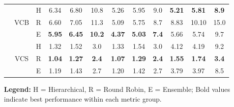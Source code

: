 \begin{table}[!h]
{\begin{tabular}{c|c|c|ccc|ccc|ccc}
& \multirow{3}{*}{VCB}
& H & 6.34 & 6.80 & 10.8 & 5.26 & 5.95 & 9.0 & \textbf{5.21} & \textbf{5.81} & \textbf{8.9} \\
& & R & 6.60 & 7.05 & 11.3 & 5.09 & 5.75 & 8.7 & 8.83 & 10.10 & 15.0 \\
& & E & \textbf{5.95} & \textbf{6.45} & \textbf{10.2} & \textbf{4.37} & \textbf{5.03} & \textbf{7.4} & 5.66 & 5.74 & 9.7 \\

& \multirow{3}{*}{VCS}
& H & 1.32 & 1.52 & 3.0 & 1.33 & 1.54 & 3.0 & 4.12 & 4.19 & 9.2 \\
& & R & \textbf{1.04} & \textbf{1.27} & \textbf{2.4} & \textbf{1.07} & \textbf{1.29} & \textbf{2.4} & \textbf{1.55} & \textbf{1.74} & \textbf{3.4} \\
& & E & 1.19 & 1.43 & 2.7 & 1.20 & 1.42 & 2.7 & 3.79 & 3.97 & 8.5 \\

\bottomrule
\end{tabular}
}

\vspace{0.3cm}
\footnotesize
\textbf{Legend:} H = Hierarchical, R = Round Robin, E = Ensemble; Bold values indicate best performance within each metric group.
\end{table}
